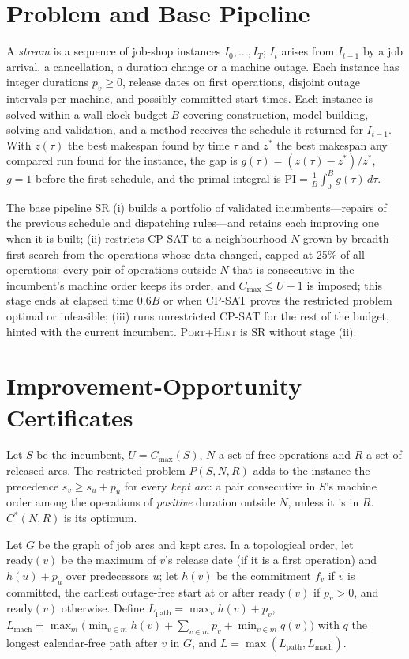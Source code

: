 \documentclass[letterpaper]{article} %
\newcommand{\base}{\textsc{SR}}
\newcommand{\ph}{\textsc{Port+Hint}}
\begin{document}
\section{Problem and Base Pipeline}

A \emph{stream} is a sequence of job-shop instances $I_0,\dots,I_T$; $I_t$ arises from $I_{t-1}$ by a job arrival, a cancellation, a duration change or a machine outage. Each instance has integer durations $p_v \ge 0$, release dates on first operations, disjoint outage intervals per machine, and possibly committed start times. Each instance is solved within a wall-clock budget $B$ covering construction, model building, solving and validation, and a method receives the schedule it returned for $I_{t-1}$. With $z(\tau)$ the best makespan found by time $\tau$ and $z^*$ the best makespan any compared run found for the instance, the gap is $g(\tau)=(z(\tau)-z^*)/z^*$, $g=1$ before the first schedule, and the primal integral is $\mathrm{PI}=\frac1B\int_0^B g(\tau)\,d\tau$.

The base pipeline \base{} (i) builds a portfolio of validated incumbents---repairs of the previous schedule and dispatching rules---and retains each improving one when it is built; (ii) restricts CP-SAT to a neighbourhood $N$ grown by breadth-first search from the operations whose data changed, capped at 25\% of all operations: every pair of operations outside $N$ that is consecutive in the incumbent's machine order keeps its order, and $C_{\max} \le U-1$ is imposed; this stage ends at elapsed time $0.6B$ or when CP-SAT proves the restricted problem optimal or infeasible; (iii) runs unrestricted CP-SAT for the rest of the budget, hinted with the current incumbent. \ph{} is \base{} without stage (ii).

\section{Improvement-Opportunity Certificates}

Let $S$ be the incumbent, $U=C_{\max}(S)$, $N$ a set of free operations and $R$ a set of released arcs. The restricted problem $P(S,N,R)$ adds to the instance the precedence $s_v \ge s_u+p_u$ for every \emph{kept arc}: a pair consecutive in $S$'s machine order among the operations of \emph{positive} duration outside $N$, unless it is in $R$. $C^*(N,R)$ is its optimum.

Let $G$ be the graph of job arcs and kept arcs. In a topological order, let $\mathrm{ready}(v)$ be the maximum of $v$'s release date (if it is a first operation) and $h(u)+p_u$ over predecessors $u$; let $h(v)$ be the commitment $f_v$ if $v$ is committed, the earliest outage-free start at or after $\mathrm{ready}(v)$ if $p_v>0$, and $\mathrm{ready}(v)$ otherwise. Define $L_{\mathrm{path}}=\max_v h(v)+p_v$, $L_{\mathrm{mach}}=\max_m \bigl(\min_{v\in m} h(v)+\sum_{v\in m} p_v+\min_{v\in m} q(v)\bigr)$ with $q$ the longest calendar-free path after $v$ in $G$, and $L=\max(L_{\mathrm{path}},L_{\mathrm{mach}})$.
\end{document}
